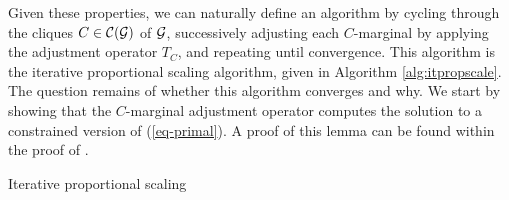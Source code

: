 Given these properties, we can naturally define an algorithm by cycling through the cliques $C \in {\mathcal{C}}({\mathcal{G}})$ of ${\mathcal{G}}$, successively adjusting each $C$-marginal by applying the adjustment operator $T_C$, and repeating until convergence. This algorithm is the iterative proportional scaling algorithm, given in Algorithm \ref{alg:itpropscale}. The question remains of whether this algorithm converges and why. We start by showing that the $C$-marginal adjustment operator computes the solution to a constrained version of (\ref{eq-primal}). A proof of this lemma can be found within the proof of \cite[Theorem 5.4]{lauritzen1996}.

\begin{algorithm}[t!]
    \caption{Iterative proportional scaling}
    \label{alg:itpropscale}
    \begin{algorithmic}[1]
    
        \EndFor
        \Else
        \EndIf
    \end{algorithmic}
\end{algorithm}

